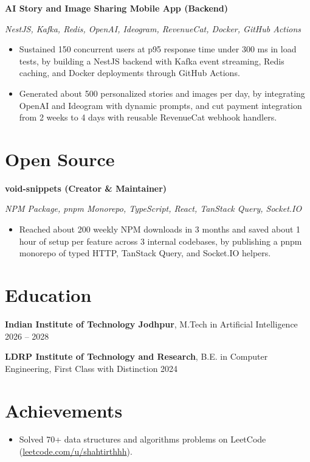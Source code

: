 \documentclass[a4paper,10pt]{article}
\newcommand{\project}[2]{\vspace{2pt}\textbf{#1}\par\textit{#2}\par\vspace{1pt}}
\begin{document}
\project{AI Story and Image Sharing Mobile App (Backend)}{NestJS, Kafka, Redis, OpenAI, Ideogram, RevenueCat, Docker, GitHub Actions}
\begin{itemize}
  \item Sustained 150 concurrent users at p95 response time under 300 ms in load tests, by building a NestJS backend with Kafka event streaming, Redis caching, and Docker deployments through GitHub Actions.
  \item Generated about 500 personalized stories and images per day, by integrating OpenAI and Ideogram with dynamic prompts, and cut payment integration from 2 weeks to 4 days with reusable RevenueCat webhook handlers.
\end{itemize}

\section{Open Source}
\project{void-snippets (Creator \& Maintainer)}{NPM Package, pnpm Monorepo, TypeScript, React, TanStack Query, Socket.IO}
\begin{itemize}
  \item Reached about 200 weekly NPM downloads in 3 months and saved about 1 hour of setup per feature across 3 internal codebases, by publishing a pnpm monorepo of typed HTTP, TanStack Query, and Socket.IO helpers.
\end{itemize}

\section{Education}
\textbf{Indian Institute of Technology Jodhpur}, M.Tech in Artificial Intelligence \hfill 2026 -- 2028\par
\textbf{LDRP Institute of Technology and Research}, B.E. in Computer Engineering, First Class with Distinction \hfill 2024\par


\section{Achievements}
\begin{itemize}
  \item Solved 70+ data structures and algorithms problems on LeetCode (\href{https://leetcode.com/u/shahtirthhh}{leetcode.com/u/shahtirthhh}).
\end{itemize}
\end{document}

